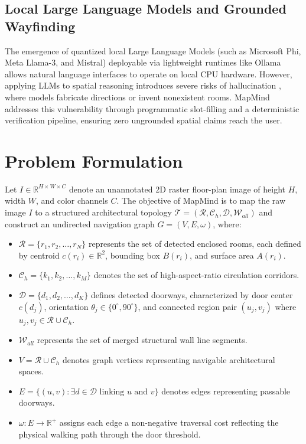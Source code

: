 \documentclass[conference]{IEEEtran}
\begin{document}
\subsection{Local Large Language Models and Grounded Wayfinding}
The emergence of quantized local Large Language Models (such as Microsoft Phi, Meta Llama-3, and Mistral) deployable via lightweight runtimes like Ollama \cite{ollama2024} allows natural language interfaces to operate on local CPU hardware. However, applying LLMs to spatial reasoning introduces severe risks of hallucination \cite{huang2024hallucination}, where models fabricate directions or invent nonexistent rooms. MapMind addresses this vulnerability through programmatic slot-filling and a deterministic verification pipeline, ensuring zero ungrounded spatial claims reach the user.

\section{Problem Formulation}
Let $I \in \mathbb{R}^{H \times W \times C}$ denote an unannotated 2D raster floor-plan image of height $H$, width $W$, and color channels $C$. The objective of MapMind is to map the raw image $I$ to a structured architectural topology $\mathcal{T} = (\mathcal{R}, \mathcal{C}_h, \mathcal{D}, \mathcal{W}_{all})$ and construct an undirected navigation graph $G = (V, E, \omega)$, where:
\begin{itemize}
    \item $\mathcal{R} = \{r_1, r_2, \dots, r_N\}$ represents the set of detected enclosed rooms, each defined by centroid $c(r_i) \in \mathbb{R}^2$, bounding box $B(r_i)$, and surface area $A(r_i)$.
    \item $\mathcal{C}_h = \{k_1, k_2, \dots, k_M\}$ denotes the set of high-aspect-ratio circulation corridors.
    \item $\mathcal{D} = \{d_1, d_2, \dots, d_K\}$ defines detected doorways, characterized by door center $c(d_j)$, orientation $\theta_j \in \{0^\circ, 90^\circ\}$, and connected region pair $(u_j, v_j)$ where $u_j, v_j \in \mathcal{R} \cup \mathcal{C}_h$.
    \item $\mathcal{W}_{all}$ represents the set of merged structural wall line segments.
    \item $V = \mathcal{R} \cup \mathcal{C}_h$ denotes graph vertices representing navigable architectural spaces.
    \item $E = \{(u, v) : \exists d \in \mathcal{D} \text{ linking } u \text{ and } v\}$ denotes edges representing passable doorways.
    \item $\omega: E \to \mathbb{R}^+$ assigns each edge a non-negative traversal cost reflecting the physical walking path through the door threshold.
\end{itemize}
\end{document}
